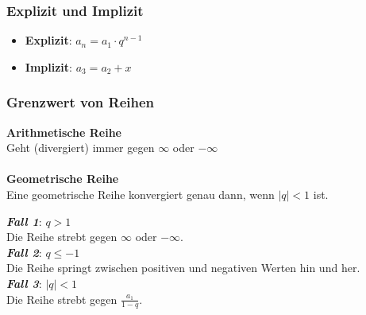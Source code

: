 \subsubsection{Explizit und Implizit}
\begin{itemize}
	\item \textbf{Explizit}: $a_n = a_1 \cdot q^{n-1}$
	\item \textbf{Implizit}: $a_{3} = a_2 + x$
\end{itemize}

\subsubsection{Grenzwert von Reihen}
\textbf{Arithmetische Reihe}\\
Geht (divergiert) immer gegen $\infty$ oder $-\infty$
\\
\\
\textbf{Geometrische Reihe}\\
Eine geometrische Reihe konvergiert genau dann, wenn $|q| < 1$ ist.
\begin{flushleft}
    \textit{\textbf{Fall 1}}: $q > 1$ \\
    Die Reihe strebt gegen $\infty$ oder $-\infty$. \\[0.5em]
    \textit{\textbf{Fall 2}}: $q \leq -1$ \\
    Die Reihe springt zwischen positiven und negativen Werten hin und her. \\[0.5em]
    \textit{\textbf{Fall 3}}: $|q| < 1$ \\
    Die Reihe strebt gegen $\frac{a_1}{1-q}$.
\end{flushleft}
